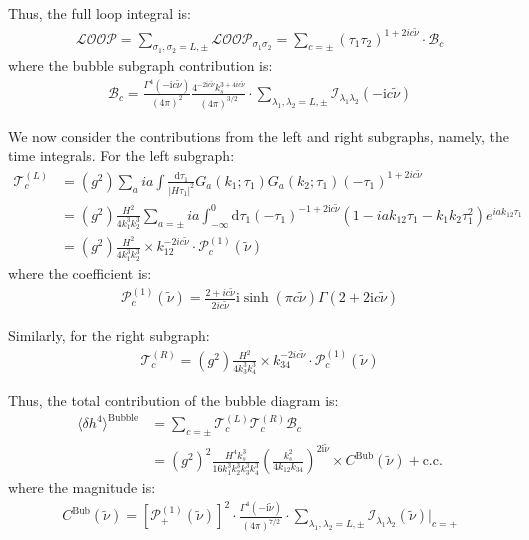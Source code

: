 \documentclass[a4paper,12pt]{article}
\def\di{{\mathrm{d}}}
\def\la{\langle}\def\ra{\rangle}
\def\ii{\mathrm{i}}
\def\lam{\lambda}
\def\si{\sigma}
\def\tn{\tilde\nu}
\begin{document}
Thus, the full loop integral is:
\begin{align}
    \mathcal{LOOP} = 
    \sum_{\si_1,\si_2=L,\pm}
    \mathcal{{LOOP}}_{\si_1\si_2}  
    =\sum_{c=\pm} (\tau_1\tau_2)^{1+2ic\tn} \cdot \mathcal{B}_c
\end{align}
where the bubble subgraph contribution is:
\begin{align}
    \mathcal{B}_c = \frac{\Gamma^4(-\ii c\tn)}{(4\pi)^2} \frac{4^{-2\ii c \tn} k_s^{3+4ic\tn}}{(4\pi)^{3/2}} 
    \cdot \sum_{\lam_1,\lam_2=L,\pm} 
    \mathcal{I}_{\lam_1\lam_2}(-\ii c\tn)
\end{align}

We now consider the contributions from the left and right subgraphs, namely, the time integrals.
For the left subgraph:
\begin{align}
    \mathcal{T}^{(L)}_c &= (g^2) \sum_a ia \int \frac{\di \tau_1}{|H \tau_1|^2} G_a(k_1;\tau_1) G_a(k_2;\tau_1) (-\tau_1)^{1+2ic\tn} \nonumber \\
    &= (g^2) \frac{H^2}{4k_1^3 k_2^3} \sum_{a=\pm} ia \int_{-\infty}^{0} \di \tau_1 (-\tau_1)^{-1+2\ii c\tn} (1 -iak_{12}\tau_1-k_1k_2\tau_1^2) e^{iak_{12}\tau_1} \nonumber \\
    &= (g^2) \frac{H^2}{4k_1^3 k_2^3} \times k_{12}^{-2ic\tn} \cdot \mathcal{P}^{(1)}_c(\tn)
\end{align}
where the coefficient is:
\begin{align}
    \mathcal{P}^{(1)}_c(\tn) = \frac{2+ic\tn}{2ic\tn} \ii \sinh(\pi c \tn) \Gamma(2+2\ii c\tn)
\end{align}

Similarly, for the right subgraph:
\begin{align}
    \mathcal{T}^{(R)}_c = (g^2) \frac{H^2}{4k_3^3 k_4^3} \times k_{34}^{-2ic\tn} \cdot \mathcal{P}^{(1)}_c(\tn)
\end{align}

Thus, the total contribution of the bubble diagram is:
\begin{align}
    \la \delta h^4 \ra^{\text{Bubble}} &= \sum_{c=\pm} \mathcal{T}^{(L)}_c \mathcal{T}^{(R)}_c \mathcal{B}_c \\
    &= (g^2)^2 \frac{H^4 k_s^3}{16 k_1^3 k_2^3 k_3^3 k_4^3} \left( \frac{k_s^2}{4k_{12}k_{34}}\right)^{2\ii\tn} \times C^{\text{Bub}}(\tn) + \text{c.c.}
\end{align}
where the magnitude is:
\begin{align}
    C^{\text{Bub}}(\tn) = 
    [\mathcal{P}^{(1)}_+(\tn)]^2 \cdot
    \frac{\Gamma^4(-\ii \tn)}{(4\pi)^{7/2}} \cdot 
    \sum_{\lam_1,\lam_2=L,\pm} \mathcal{I}_{\lam_1\lam_2}(\tn)|_{c=+}
\end{align}
\end{document}
